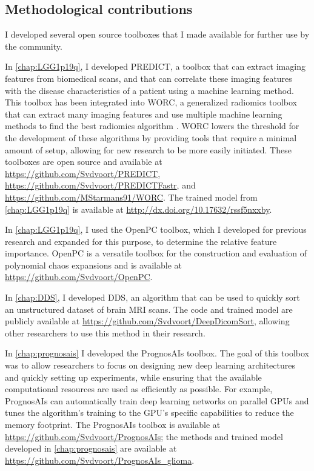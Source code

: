 \subsection{Methodological contributions}

I developed several open source toolboxes that I made available for further use by the community.

In \cref{chap:LGG1p19q}, I developed PREDICT, a toolbox that can extract imaging features from biomedical scans, and that can correlate these imaging features with the disease characteristics of a patient using a machine learning method.
This toolbox has been integrated into WORC, a generalized radiomics toolbox that can extract many imaging features and use multiple machine learning methods to find the best radiomics algorithm \autocite{mstarmans2020worc}.
WORC lowers the threshold for the development of these algorithms by providing tools that require a minimal amount of setup, allowing for new research to be more easily initiated.
These toolboxes are open source and available at \url{https://github.com/Svdvoort/PREDICT}, \url{https://github.com/Svdvoort/PREDICTFastr}, and \url{https://github.com/MStarmans91/WORC}.
The trained model from \cref{chap:LGG1p19q} is available at \url{http://dx.doi.org/10.17632/rssf5nxxby}.

In \cref{chap:LGG1p19q}, I used the OpenPC toolbox, which I developed for previous research and expanded for this purpose, to determine the relative feature importance.
OpenPC is a versatile toolbox for the construction and evaluation of polynomial chaos expansions and is available at \url{https://github.com/Svdvoort/OpenPC}.

In \cref{chap:DDS}, I developed \acrlong{DDS}, an algorithm that can be used to quickly sort an unstructured dataset of brain \gls{MRI} scans.
The code and trained model are publicly available at \url{https://github.com/Svdvoort/DeepDicomSort}, allowing other researchers to use this method in their research.


In \cref{chap:prognosais} I developed the PrognosAIs toolbox.
The goal of this toolbox was to allow researchers to focus on designing new deep learning architectures and quickly setting up experiments, while ensuring that the available computational resources are used as efficiently as possible.
For example, PrognosAIs can automatically train deep learning networks on parallel GPUs and tunes the algorithm's training to the GPU's specific capabilities to reduce the memory footprint.
The PrognosAIs toolbox is available at \url{https://github.com/Svdvoort/PrognosAIs}; the methods and trained model developed in \cref{chap:prognosais} are available at \url{https://github.com/Svdvoort/PrognosAIs_glioma}.

